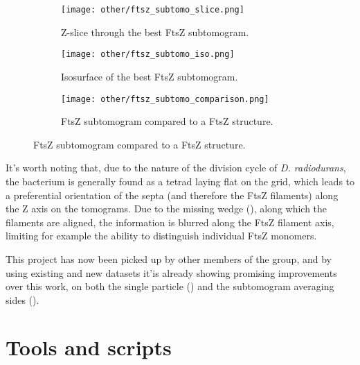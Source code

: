 \begin{figure}
    \centering
    \begin{subfigure}[B]{.32\textwidth}
        \centering
        \texttt{[image: other/ftsz\_subtomo\_slice.png]}
        \caption{Z-slice through the best FtsZ subtomogram.}
        \label{fig:ftsz_subtomo_slice}
    \end{subfigure}%
    \hfill
    \begin{subfigure}[B]{.32\textwidth}
        \centering
        \texttt{[image: other/ftsz\_subtomo\_iso.png]}
        \caption{Isosurface of the best FtsZ subtomogram.}
        \label{fig:ftsz_subtomo_iso}
    \end{subfigure}%
    \hfill
    \begin{subfigure}[B]{.32\textwidth}
        \centering
        \texttt{[image: other/ftsz\_subtomo\_comparison.png]}
        \caption{FtsZ subtomogram compared to a FtsZ structure.}
        \label{fig:ftsz_subtomo_iso_struct}
    \end{subfigure}%
    \label{fig:ftsz_subtomo}
\end{figure}

It's worth noting that, due to the nature of the division cycle of \textit{D. radiodurans}, the bacterium is generally found as a tetrad laying flat on the grid, which leads to a preferential orientation of the septa (and therefore the FtsZ filaments) along the Z axis on the tomograms.
Due to the missing wedge (), along which the filaments are aligned, the information is blurred along the FtsZ filament axis, limiting for example the ability to distinguish individual FtsZ monomers.

This project has now been picked up by other members of the group, and by using existing and new datasets it'is already showing promising improvements over this work, on both the single particle () and the subtomogram averaging sides ().


\section{Tools and scripts}

